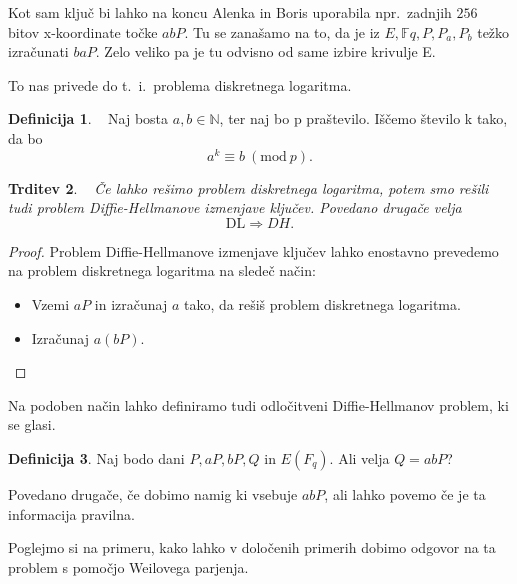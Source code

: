 \documentclass[12pt,a4paper,twoside]{article}
\theoremstyle{definition} %
\newtheorem{definicija}{Definicija}[section]
\theoremstyle{plain} %
\newtheorem{trditev}[definicija]{Trditev}
\numberwithin{equation}{section}  %
\newcommand{\N}{\mathbb N}
\newcommand{\F}{\mathbb F}
\newcommand{\E}[1]{E({#1})}
\begin{document}
Kot sam ključ bi lahko na koncu Alenka in Boris uporabila npr.\  zadnjih $256$ bitov x-koordinate točke $abP$. Tu se zanašamo na to, da je iz $E, \F{q},P, P_a, P_b$ težko izračunati $baP$. Zelo veliko pa je tu odvisno od same izbire krivulje E.

To nas privede do t.\ i.\ problema diskretnega logaritma.


\begin{definicija}~
Naj bosta $a, b \in \N$, ter naj bo p praštevilo. Iščemo število k tako, da bo
$$a^k \equiv b\ (\text{mod} \ p).$$
\end{definicija}

\begin{trditev}~
Če lahko rešimo problem diskretnega logaritma, potem smo rešili tudi problem Diffie-Hellmanove izmenjave ključev. Povedano drugače velja
$$\text{DL} \Rightarrow DH.$$
\end{trditev}

\begin{proof}
Problem Diffie-Hellmanove izmenjave ključev lahko enostavno prevedemo na problem diskretnega logaritma na sledeč način:

\begin{itemize}
\item Vzemi $aP$ in izračunaj $a$ tako, da rešiš problem diskretnega logaritma.
\item Izračunaj $a(bP)$.
\end{itemize}

\end{proof}

Na podoben način lahko definiramo tudi odločitveni Diffie-Hellmanov problem, ki se glasi.
\begin{definicija}
Naj bodo dani $P,aP,bP,Q$ in $\E{F_q}$. Ali velja $Q = abP$?
\end{definicija}

Povedano drugače, če dobimo namig ki vsebuje $abP$, ali lahko povemo če je ta informacija pravilna.

Poglejmo si na primeru, kako lahko v določenih primerih dobimo odgovor na ta problem s pomočjo Weilovega parjenja.
\end{document}
